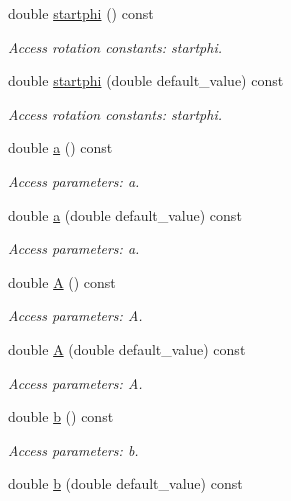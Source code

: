 \begin{DoxyCompactItemize}
double \hyperlink{struct_d_d4hep_1_1_x_m_l_1_1_dimension_aa5f72a15e55b2a7708d55171af03b43e}{startphi} () const
\begin{DoxyCompactList}\small\item\em Access rotation constants\+: startphi. \end{DoxyCompactList}\item 
double \hyperlink{struct_d_d4hep_1_1_x_m_l_1_1_dimension_a7d5e7d17330c5f350b5025e31b0efbdf}{startphi} (double default\+\_\+value) const
\begin{DoxyCompactList}\small\item\em Access rotation constants\+: startphi. \end{DoxyCompactList}\item 
double \hyperlink{struct_d_d4hep_1_1_x_m_l_1_1_dimension_ac4ee6372c397130c2565d9c5bae40118}{a} () const
\begin{DoxyCompactList}\small\item\em Access parameters\+: a. \end{DoxyCompactList}\item 
double \hyperlink{struct_d_d4hep_1_1_x_m_l_1_1_dimension_a17543094c676744b460cde971e8bd921}{a} (double default\+\_\+value) const
\begin{DoxyCompactList}\small\item\em Access parameters\+: a. \end{DoxyCompactList}\item 
double \hyperlink{struct_d_d4hep_1_1_x_m_l_1_1_dimension_acfbf84e7e830bd3a8085f8c53d39fc1c}{A} () const
\begin{DoxyCompactList}\small\item\em Access parameters\+: A. \end{DoxyCompactList}\item 
double \hyperlink{struct_d_d4hep_1_1_x_m_l_1_1_dimension_a9117763ec12e9a29318293c24926f0f0}{A} (double default\+\_\+value) const
\begin{DoxyCompactList}\small\item\em Access parameters\+: A. \end{DoxyCompactList}\item 
double \hyperlink{struct_d_d4hep_1_1_x_m_l_1_1_dimension_ae755aaabfb6865b8a0833499d3abbd4f}{b} () const
\begin{DoxyCompactList}\small\item\em Access parameters\+: b. \end{DoxyCompactList}\item 
double \hyperlink{struct_d_d4hep_1_1_x_m_l_1_1_dimension_a7069a933c0f0b87afc1cc73a10aec750}{b} (double default\+\_\+value) const

\end{DoxyCompactItemize}
